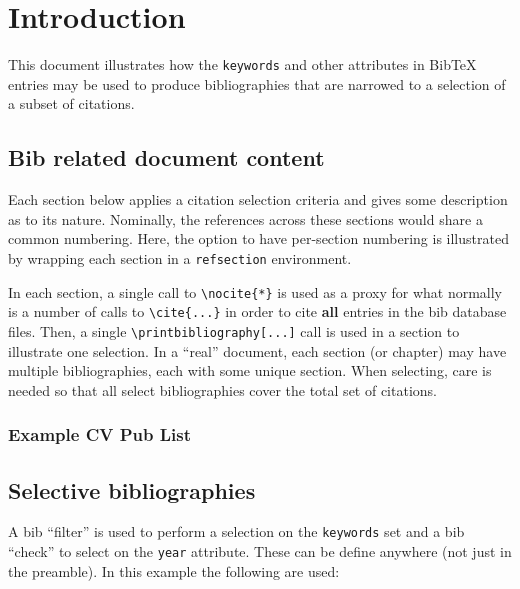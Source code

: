 \documentclass{article}
\newenvironment{cvpubs}{\begin{refsection}}{\printbibliography\end{refsection}}
\newcommand{\cvpub}[1]{\nocite{#1}}
\begin{document}
\section{Introduction}

This document illustrates how the \texttt{keywords} and other attributes in BibTeX entries may be used to produce bibliographies that are narrowed to a selection of a subset of citations.

\subsection{Bib related document content}

Each section below applies a citation selection criteria and gives some description as to its nature.  Nominally, the references across these sections would share a common numbering.  Here, the option to have per-section numbering is illustrated by wrapping each section in a \texttt{refsection} environment.  

In each section, a single call to \verb|\nocite{*}| is used as a proxy for what normally is a number of calls to \verb|\cite{...}| in order to cite \textbf{all} entries in the bib database files.  Then, a single \verb|\printbibliography[...]| call is used in a section to illustrate one selection.  In a ``real'' document, each section (or chapter) may have multiple bibliographies, each with some unique section.  When selecting, care is needed so that all select bibliographies cover the total set of citations.

\subsubsection{Example CV Pub List}

\begin{cvpubs}
  \cvpub{Viren:2000kp}
  \cvpub{DayaBay:2024nip}
  \cvpub{MicroBooNE:2024sec}
\end{cvpubs}

\subsection{Selective bibliographies}

A bib ``filter'' is used to perform a selection on the \texttt{keywords} set and a bib ``check'' to select on the \texttt{year} attribute.  These can be define anywhere (not just in the preamble).  In this example the following are used:

\end{document}
